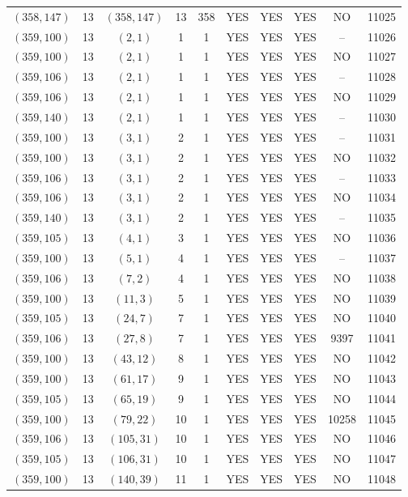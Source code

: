 \begin{longtable}{|c|c|c|c|c|c|c|c|c|c|}
$(358, 147)$ & 13 & $(358, 147)$ & 13 & 358 & YES & YES & YES & NO & 11025\\
$(359, 100)$ & 13 & $(2, 1)$ & 1 & 1 & YES & YES & YES & -- & 11026\\
$(359, 100)$ & 13 & $(2, 1)$ & 1 & 1 & YES & YES & YES & NO & 11027\\
$(359, 106)$ & 13 & $(2, 1)$ & 1 & 1 & YES & YES & YES & -- & 11028\\
$(359, 106)$ & 13 & $(2, 1)$ & 1 & 1 & YES & YES & YES & NO & 11029\\
$(359, 140)$ & 13 & $(2, 1)$ & 1 & 1 & YES & YES & YES & -- & 11030\\
$(359, 100)$ & 13 & $(3, 1)$ & 2 & 1 & YES & YES & YES & -- & 11031\\
$(359, 100)$ & 13 & $(3, 1)$ & 2 & 1 & YES & YES & YES & NO & 11032\\
$(359, 106)$ & 13 & $(3, 1)$ & 2 & 1 & YES & YES & YES & -- & 11033\\
$(359, 106)$ & 13 & $(3, 1)$ & 2 & 1 & YES & YES & YES & NO & 11034\\
$(359, 140)$ & 13 & $(3, 1)$ & 2 & 1 & YES & YES & YES & -- & 11035\\
$(359, 105)$ & 13 & $(4, 1)$ & 3 & 1 & YES & YES & YES & NO & 11036\\
$(359, 100)$ & 13 & $(5, 1)$ & 4 & 1 & YES & YES & YES & -- & 11037\\
$(359, 106)$ & 13 & $(7, 2)$ & 4 & 1 & YES & YES & YES & NO & 11038\\
$(359, 100)$ & 13 & $(11, 3)$ & 5 & 1 & YES & YES & YES & NO & 11039\\
$(359, 105)$ & 13 & $(24, 7)$ & 7 & 1 & YES & YES & YES & NO & 11040\\
$(359, 106)$ & 13 & $(27, 8)$ & 7 & 1 & YES & YES & YES & 9397 & 11041\\
$(359, 100)$ & 13 & $(43, 12)$ & 8 & 1 & YES & YES & YES & NO & 11042\\
$(359, 100)$ & 13 & $(61, 17)$ & 9 & 1 & YES & YES & YES & NO & 11043\\
$(359, 105)$ & 13 & $(65, 19)$ & 9 & 1 & YES & YES & YES & NO & 11044\\
$(359, 100)$ & 13 & $(79, 22)$ & 10 & 1 & YES & YES & YES & 10258 & 11045\\
$(359, 106)$ & 13 & $(105, 31)$ & 10 & 1 & YES & YES & YES & NO & 11046\\
$(359, 105)$ & 13 & $(106, 31)$ & 10 & 1 & YES & YES & YES & NO & 11047\\
$(359, 100)$ & 13 & $(140, 39)$ & 11 & 1 & YES & YES & YES & NO & 11048\\

\end{longtable}
